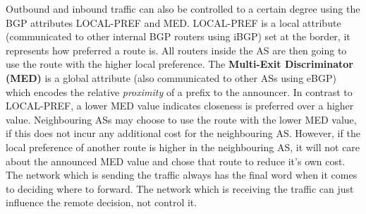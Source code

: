 Outbound and inbound traffic can also be controlled to a certain degree using the BGP attributes LOCAL-PREF and MED. LOCAL-PREF is a local attribute (communicated to other internal BGP routers using iBGP) set at the border, it represents how preferred a route is. All routers inside the AS are then going to use the route with the higher local preference. The \textbf{Multi-Exit Discriminator (MED)} is a global attribute (also communicated to other ASs using eBGP) which encodes the relative \textit{proximity} of a prefix to the announcer. In contrast to LOCAL-PREF, a lower MED value indicates closeness is preferred over a higher value. Neighbouring ASs may choose to use the route with the lower MED value, if this does not incur any additional cost for the neighbouring AS. However, if the local preference of another route is higher in the neighbouring AS, it will not care about the announced MED value and chose that route to reduce it's own cost.\vspace{.3cm}\\
The network which is sending the traffic always has the final word when it comes to deciding where to forward. The network which is receiving the traffic can just influence the remote decision, not control it.

